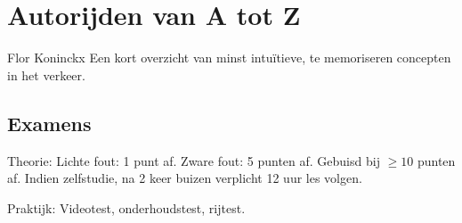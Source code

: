 \chapter{Autorijden van A tot Z}{Flor Koninckx}
Een kort overzicht van minst intuïtieve, te memoriseren concepten in het verkeer.

\section{Examens}
\begin{outline}
\1 Theorie:
	\2 Lichte fout: 1 punt af. Zware fout: 5 punten af.
	\2 Gebuisd bij $\geq 10$ punten af.
	\2 Indien zelfstudie, na 2 keer buizen verplicht 12 uur les volgen.

\1 Praktijk:
	\2 Videotest, onderhoudstest, rijtest.
\end{outline}

